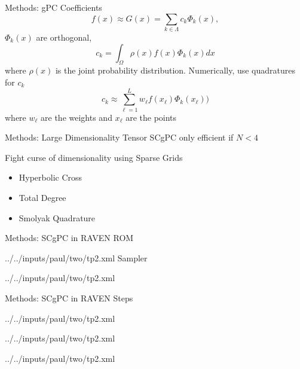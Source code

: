 \documentclass[t,9pt,svgnames]{beamer}
\begin{document}
\begin{frame}{Methods: gPC Coefficients}
  \vfill
  \begin{equation}
    f(x) \approx G(x) = \sum_{k\in\Lambda} c_k \Phi_k(x), 
  \end{equation}
  \vfill
  $\Phi_k(x)$ are orthogonal,
  \begin{equation}
    c_k = \int_\Omega \rho(x) f(x) \Phi_k(x) dx
  \end{equation}
  where $\rho(x)$ is the joint probability distribution.
  \vfill
  Numerically, use quadratures for $c_k$
  \begin{equation}
    c_k \approx\sum_{\ell=1}^L w_\ell f(x_\ell) \Phi_k(x_\ell))
  \end{equation}
  where $w_\ell$ are the weights and $x_\ell$ are the points
  \vfill
\end{frame}

\begin{frame}{Methods: Large Dimensionality}
  \vfill
  Tensor SCgPC only efficient if $N<4$
  \vfill

  Fight curse of dimensionality using Sparse Grids
  \vfill
  \begin{itemize}
    \item Hyperbolic Cross
    \item Total Degree
  \vfill
    \item Smolyak Quadrature
  \end{itemize}
  \vfill
\end{frame}

\begin{frame}[fragile]{Methods: SCgPC in RAVEN}
  ROM
  
          {../../inputs/paul/two/tp2.xml}
  \vfill
  Sampler
  
          {../../inputs/paul/two/tp2.xml}
\end{frame}

\begin{frame}[fragile]{Methods: SCgPC in RAVEN}
  Steps
  
          {../../inputs/paul/two/tp2.xml}
  
          {../../inputs/paul/two/tp2.xml}
  
          {../../inputs/paul/two/tp2.xml}
\end{frame}
\end{document}

